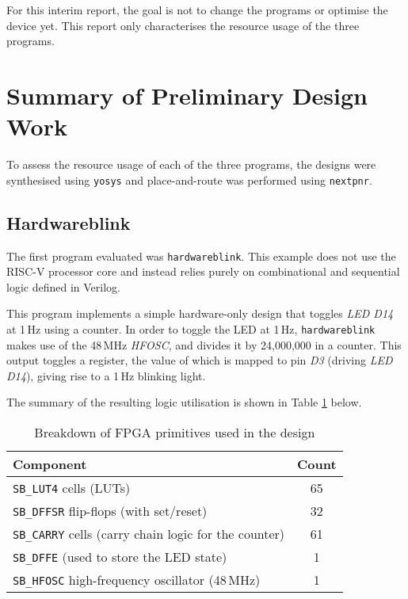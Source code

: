 \documentclass[a4paper,10pt]{article}
\begin{document}
For this interim report, the goal is not to 
change the programs or optimise the device yet.
This report only characterises the resource usage of the three programs.


\section{Summary of Preliminary Design Work}
\label{sec:Summary_of_Preliminary_Design_Work}

To assess the resource usage of each of the three programs, 
the designs were synthesised using \texttt{yosys} 
and place-and-route was performed using \texttt{nextpnr}. 

\subsection{Hardwareblink}
\label{sec:Hardwareblink}

The first program evaluated was \texttt{hardwareblink}.
This example does not use the RISC-V processor core and 
instead relies purely on combinational and sequential logic defined in Verilog.

This program implements a simple hardware-only design that 
toggles \textit{LED D14} at 1\,Hz using a counter. 
In order to toggle the LED at 1\,Hz, 
\texttt{hardwareblink} makes use of the 48\,MHz \textit{HFOSC},
and divides it by 24,000,000 in a counter.
This output toggles a register, 
the value of which is mapped to pin \textit{D3} (driving \textit{LED D14}),
giving rise to a 1\,Hz blinking light.

The summary of the resulting logic utilisation is shown
in Table \ref{tab:hardware_yosys_report} below.

\begin{table}[H]
    \centering
    \begin{tabular}{|l|c|}
        \hline
        \textbf{Component} & \textbf{Count} \\
        \hline
        \texttt{SB\_LUT4} cells (LUTs) & 65 \\
        \texttt{SB\_DFFSR} flip-flops (with set/reset) & 32 \\
        \texttt{SB\_CARRY} cells (carry chain logic for the counter) & 61 \\
        \texttt{SB\_DFFE} (used to store the LED state) & 1 \\
        \texttt{SB\_HFOSC} high-frequency oscillator (48\,MHz) & 1 \\
        \hline
    \end{tabular}
    \caption{Breakdown of FPGA primitives used in the design}
    \label{tab:hardware_yosys_report}
\end{table}
\end{document}
